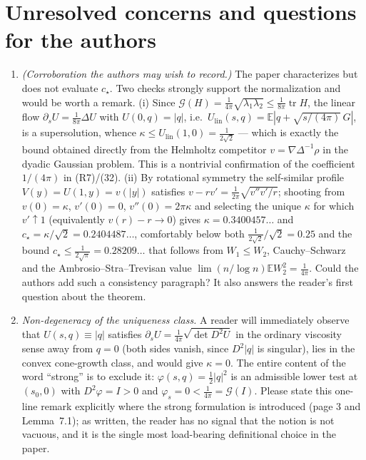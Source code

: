 \documentclass[11pt]{article}
\newcommand{\E}{\mathbb{E}}
\begin{document}
\section*{Unresolved concerns and questions for the authors}
\begin{enumerate}[label=Q\arabic*., leftmargin=2.6em, itemsep=3pt]
  \item \emph{(Corroboration the authors may wish to record.)} The paper characterizes but does
  not evaluate $c_\star$. Two checks strongly support the normalization and would be worth a
  remark. (i) Since $\mathcal G(H)=\frac1{4\pi}\sqrt{\lambda_1\lambda_2}\le\frac1{8\pi}
  \operatorname{tr}H$, the linear flow $\partial_sU=\frac1{8\pi}\Delta U$ with $U(0,q)=|q|$,
  i.e.\ $U_{\mathrm{lin}}(s,q)=\E|q+\sqrt{s/(4\pi)}\,G|$, is a supersolution, whence
  $\kappa\le U_{\mathrm{lin}}(1,0)=\frac1{2\sqrt2}$ --- which is exactly the bound obtained
  directly from the Helmholtz competitor $v=\nabla\Delta^{-1}\rho$ in the dyadic Gaussian
  problem. This is a nontrivial confirmation of the coefficient $1/(4\pi)$ in (R7)/(32).
  (ii) By rotational symmetry the self-similar profile $V(y)=U(1,y)=v(|y|)$ satisfies
  $v-rv'=\frac1{2\pi}\sqrt{v''v'/r}$; shooting from $v(0)=\kappa$, $v'(0)=0$, $v''(0)=2\pi\kappa$
  and selecting the unique $\kappa$ for which $v'\uparrow1$ (equivalently $v(r)-r\to0$) gives
  $\kappa=0.3400457\ldots$ and $c_\star=\kappa/\sqrt2=0.2404487\ldots$, comfortably below both
  $\frac1{2\sqrt2}/\sqrt2=0.25$ and the bound $c_\star\le\frac1{2\sqrt\pi}=0.28209\ldots$ that
  follows from $W_1\le W_2$, Cauchy--Schwarz and the Ambrosio--Stra--Trevisan value
  $\lim (n/\log n)\E W_2^2=\frac1{4\pi}$. Could the authors add such a consistency
  paragraph? It also answers the reader's first question about the theorem.
  \item \emph{Non-degeneracy of the uniqueness class.} A reader will immediately observe that
  $U(s,q)\equiv|q|$ satisfies $\partial_sU=\frac1{4\pi}\sqrt{\det D^2U}$ in the ordinary
  viscosity sense away from $q=0$ (both sides vanish, since $D^2|q|$ is singular), lies in the
  convex cone-growth class, and would give $\kappa=0$. The entire content of the word
  ``strong'' is to exclude it: $\varphi(s,q)=\tfrac12|q|^2$ is an admissible lower test at
  $(s_0,0)$ with $D^2\varphi=I>0$ and $\varphi_s=0<\frac1{4\pi}=\mathcal G(I)$. Please state this
  one-line remark explicitly where the strong formulation is introduced (page 3 and Lemma~7.1);
  as written, the reader has no signal that the notion is not vacuous, and it is the single most
  load-bearing definitional choice in the paper.

\end{enumerate}
\end{document}
